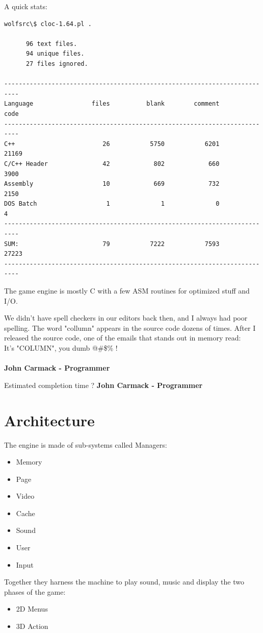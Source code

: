 \documentclass[book.tex]{subfiles}
\begin{document}
A quick stats:\\
\begin{verbatim}
wolfsrc\$ cloc-1.64.pl .

      96 text files.
      94 unique files.                              
      27 files ignored.

--------------------------------------------------------------------------
Language                files          blank        comment           code
--------------------------------------------------------------------------
C++                        26           5750           6201          21169
C/C++ Header               42            802            660           3900
Assembly                   10            669            732           2150
DOS Batch                   1              1              0              4
--------------------------------------------------------------------------
SUM:                       79           7222           7593          27223
--------------------------------------------------------------------------
\end{verbatim}
The game engine is mostly C with a few ASM routines for optimized stuff and I/O.\\


 \begin{fancyquotes}
   We didn't have spell checkers in our editors back then, and I always had poor spelling.  The word "collumn" appears in the source code dozens of times.  After I released the source code, one of the emails that stands out in memory read:
 \bigskip \\
It's "COLUMN", you dumb @\#\$\% !\\
 \bigskip \\
\textbf{John Carmack - Programmer}
 \end{fancyquotes}

\begin{fancyquotes}
Estimated completion time ?  
\textbf{John Carmack - Programmer}
 \end{fancyquotes}
 
\section{Architecture}

The engine is made of sub-systems called Managers:
\begin{itemize}
	\item Memory
	\item Page
	\item Video
	\item Cache
	\item Sound
	\item User
	\item Input
\end{itemize}
Together they harness the machine to play sound, music and display the two phases of the game:
\begin{itemize}
	\item 2D Menus
	\item 3D Action
\end{itemize}
\end{document}

